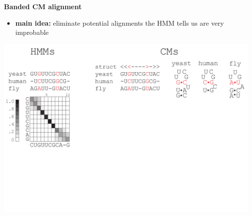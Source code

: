 \documentclass[landscape]{slides}
\begin{document}
\begin{slide}
\begin{center}
\large
\textbf{Banded CM alignment}
\end{center}
\medskip
\small
\begin{itemize}
\item
\textbf{main idea:} eliminate potential alignments the HMM tells us are very improbable
\end{itemize}
\begin{center}
\includegraphics[width=8in]{figs/post_hmm_to_cm_map2_layer1}
\end{center}
\vfill
\end{slide}
\end{document}
